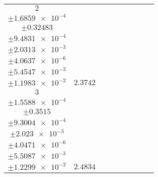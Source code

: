 \documentclass[8pt]{article}
\begin{document}
\begin{longtable}[l]{c c c c c c c c c}
$\num{2}$ & \begin{tabular}[c]{@{}c@{}}$\num{3.0096e-2}$ \\ $\pm\num{1.6859e-4}$\end{tabular} & \begin{tabular}[c]{@{}c@{}}$\num{-3.3183e-2}$ \\ $\pm\num{0.32483}$\end{tabular} & \begin{tabular}[c]{@{}c@{}}$\num{-7.4049}$ \\ $\pm\num{9.4831e-4}$\end{tabular} & \begin{tabular}[c]{@{}c@{}}$\num{723.33}$ \\ $\pm\num{2.0313e-3}$\end{tabular} & \begin{tabular}[c]{@{}c@{}}$\num{1.4471}$ \\ $\pm\num{4.0637e-6}$\end{tabular} & \begin{tabular}[c]{@{}c@{}}$\num{1.1819}$ \\ $\pm\num{5.4547e-3}$\end{tabular} & \begin{tabular}[c]{@{}c@{}}$\num{4.1048}$ \\ $\pm\num{1.1983e-2}$\end{tabular} & $\num{2.3742}$\\
$\num{3}$ & \begin{tabular}[c]{@{}c@{}}$\num{2.8998e-2}$ \\ $\pm\num{1.5588e-4}$\end{tabular} & \begin{tabular}[c]{@{}c@{}}$\num{-0.49504}$ \\ $\pm\num{0.3515}$\end{tabular} & \begin{tabular}[c]{@{}c@{}}$\num{-6.946}$ \\ $\pm\num{9.3004e-4}$\end{tabular} & \begin{tabular}[c]{@{}c@{}}$\num{723.79}$ \\ $\pm\num{2.023e-3}$\end{tabular} & \begin{tabular}[c]{@{}c@{}}$\num{1.448}$ \\ $\pm\num{4.0471e-6}$\end{tabular} & \begin{tabular}[c]{@{}c@{}}$\num{1.143}$ \\ $\pm\num{5.5087e-3}$\end{tabular} & \begin{tabular}[c]{@{}c@{}}$\num{4.0825}$ \\ $\pm\num{1.2299e-2}$\end{tabular} & $\num{2.4834}$\\

\end{longtable}
\end{document}
